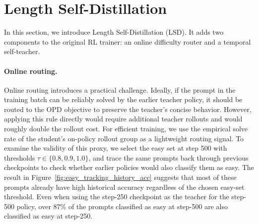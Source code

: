 \documentclass{article} %
\begin{document}
\section{Length Self-Distillation}
\label{sec:method}

In this section, we introduce Length Self-Distillation (LSD). It adds two components to the original RL trainer: an
online difficulty router and a temporal self-teacher. 


\paragraph{Online routing.}
Online routing introduces a practical challenge. Ideally, if the prompt in the training batch can be reliably solved by the earlier teacher policy, it should be routed to the OPD objective to preserve the teacher's concise behavior. However, applying this rule directly would require additional teacher rollouts and would roughly double the rollout cost. For efficient training, we use the empirical solve rate of the student’s on-policy rollout group as a lightweight routing signal. To examine the validity of this proxy, we select the easy set at step 500 with thresholds $\tau\in\{0.8,0.9,1.0\}$, and trace the same prompts back through previous checkpoints to check whether earlier policies would also classify them as easy. The result in Figure~\ref{fig:easy_tracking_history_acc} suggests that most of these prompts already have high historical accuracy regardless of the chosen easy-set threshold. Even when using the step-250 checkpoint as the teacher for the step-500 policy, over \(87\%\) of the prompts classified as easy at step-500 are also classified as easy at step-250. 
\end{document}
